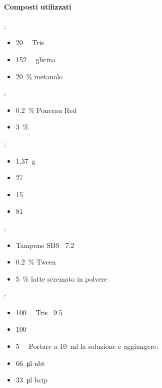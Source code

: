 \paragraph{Composti utilizzati}
\begingroup
{}
\begin{itemize}
	\begin{multicols}{2}
		:
		\begin{itemize}[squareItem]
			\item \qty{20}{\milli\Molar} Tris
			\item \qty{152}{\milli\Molar} glicina
			\item \qty{20}{\percent} metanolo
		\end{itemize}
		:
		\begin{itemize}[squareItem]
			\item \qty{0.2}{\percent} Ponceau Red
			\item \qty{3}{\percent} 
		\end{itemize}
		:
		\begin{itemize}[squareItem]
			\item \qty{1.37}{\g} 
			\item \qty{27}{\milli\Molar} 
			\item \qty{15}{\milli\Molar} 
			\item \qty{81}{\milli\Molar} 
		\end{itemize}
		:
		\begin{itemize}[squareItem]
			\item Tampone SBS \pH\ \num{7.2}
			\item \qty{0.2}{\percent} Tween
			\item \qty{5}{\percent} latte scremato in polvere
		\end{itemize}
		:
		\begin{itemize}[squareItem]
			\item \qty{100}{\milli\Molar} Tris  \pH\ \num{9.5}
			\item \qty{100}{\milli\Molar} 
			\item \qty{5}{\milli\Molar} \newline
			      \hspace*{-.5cm}Portare a \qty{10}{\ml} la soluzione e aggiungere:
			\item \qty{66}{\micro\litre} \gls{nbt}
			\item \qty{33}{\micro\litre} \gls{bcip}
		\end{itemize}
	\end{multicols}
\end{itemize}
\endgroup

